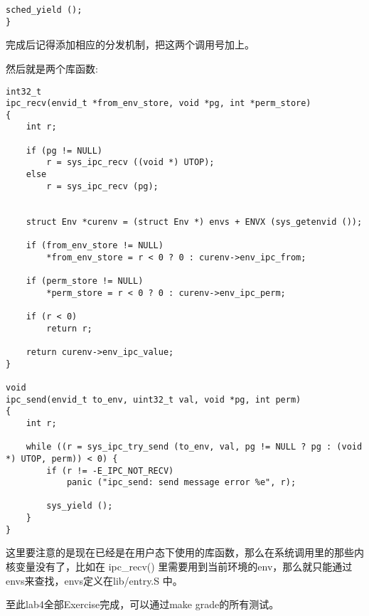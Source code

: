 \documentclass{article}
\newcommand{\funcname}[1]{{\ttfamily \small #1}}
\begin{document}
\begin{CJK*}{UTF8}{gkai}
\begin{lstlisting}[style=ccode, title={\scriptsize \ttfamily \bfseries kern/syscall.c}]
    sched_yield ();
}
\end{lstlisting}

完成后记得添加相应的分发机制，把这两个调用号加上。

\vspace{2em}

然后就是两个库函数:

\begin{lstlisting}[style=ccode, title={\scriptsize \ttfamily \bfseries lib/ipc.c}]
int32_t
ipc_recv(envid_t *from_env_store, void *pg, int *perm_store)
{
    int r;
    
    if (pg != NULL)
        r = sys_ipc_recv ((void *) UTOP);
    else
        r = sys_ipc_recv (pg);


    struct Env *curenv = (struct Env *) envs + ENVX (sys_getenvid ());

    if (from_env_store != NULL)
        *from_env_store = r < 0 ? 0 : curenv->env_ipc_from;

    if (perm_store != NULL)
        *perm_store = r < 0 ? 0 : curenv->env_ipc_perm;

    if (r < 0)
        return r;

	return curenv->env_ipc_value;
}

void
ipc_send(envid_t to_env, uint32_t val, void *pg, int perm)
{
    int r;

    while ((r = sys_ipc_try_send (to_env, val, pg != NULL ? pg : (void *) UTOP, perm)) < 0) {    
        if (r != -E_IPC_NOT_RECV)
            panic ("ipc_send: send message error %e", r);

        sys_yield ();
    }
}
\end{lstlisting}

这里要注意的是现在已经是在用户态下使用的库函数，那么在系统调用里的那些内核变量没有了，比如在 \funcname{ipc\_recv()} 里需要用到当前环境的env，那么就只能通过envs来查找，envs定义在lib/entry.S 中。

\vspace{2em}

至此lab4全部Exercise完成，可以通过make grade的所有测试。

\begin{lstlisting}[style=console]
\end{lstlisting}

\begin{lstlisting}[style=console]
\end{lstlisting}
\begin{lstlisting}[style=console]
\end{lstlisting}
\begin{lstlisting}[style=console]
\end{lstlisting}





\end{CJK*}
\end{document}
